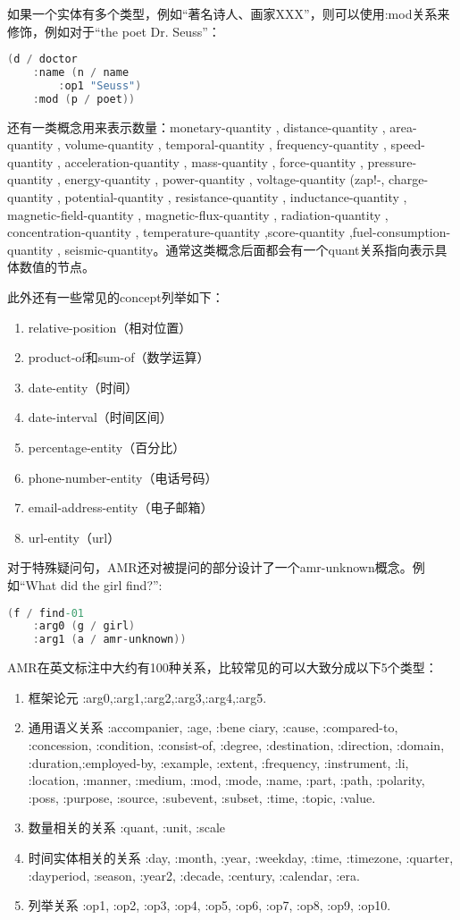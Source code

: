 \documentclass[master, winfont]{njuthesis}
\begin{document}
如果一个实体有多个类型，例如“著名诗人、画家XXX”，则可以使用:mod关系来修饰，例如对于“the poet Dr. Seuss”：
\begin{lstlisting}[language=C]
(d / doctor
	:name (n / name
		:op1 "Seuss")
	:mod (p / poet))
\end{lstlisting}

还有一类概念用来表示数量：monetary-quantity , distance-quantity , area-quantity , volume-quantity , temporal-quantity , frequency-quantity , speed-quantity , acceleration-quantity , mass-quantity , force-quantity , pressure-quantity , energy-quantity , power-quantity , voltage-quantity (zap!-, charge-quantity , potential-quantity , resistance-quantity , inductance-quantity , magnetic-field-quantity , magnetic-flux-quantity , radiation-quantity , concentration-quantity , temperature-quantity ,score-quantity ,fuel-consumption-quantity , seismic-quantity。通常这类概念后面都会有一个quant关系指向表示具体数值的节点。

此外还有一些常见的concept列举如下：
\begin{enumerate}
	\item relative-position（相对位置）
	\item product-of和sum-of（数学运算）
	\item date-entity（时间）
	\item date-interval（时间区间）
	\item percentage-entity（百分比）
	\item phone-number-entity（电话号码）
	\item email-address-entity（电子邮箱）
	\item url-entity（url）
\end{enumerate}

对于特殊疑问句，AMR还对被提问的部分设计了一个amr-unknown概念。例如“What did the girl find?”:
\begin{lstlisting}[language=C]
(f / find-01
	:arg0 (g / girl)
	:arg1 (a / amr-unknown))
\end{lstlisting}

AMR在英文标注中大约有100种关系，比较常见的可以大致分成以下5个类型：
\begin{enumerate}
	\item 框架论元 :arg0,:arg1,:arg2,:arg3,:arg4,:arg5.
	\item 通用语义关系 :accompanier, :age, :bene ciary, :cause, :compared-to, :concession, :condition, :consist-of, :degree, :destination, :direction, :domain, :duration,:employed-by, :example, :extent, :frequency, :instrument, :li, :location, :manner, :medium, :mod, :mode, :name, :part, :path, :polarity, :poss, :purpose, :source, :subevent, :subset, :time, :topic, :value.
	\item 数量相关的关系 :quant, :unit, :scale
	\item 时间实体相关的关系 :day, :month, :year, :weekday, :time, :timezone, :quarter, :dayperiod, :season, :year2, :decade, :century, :calendar, :era.
	\item 列举关系 :op1, :op2, :op3, :op4, :op5, :op6, :op7, :op8, :op9,
:op10.
\end{enumerate}
\end{document}
